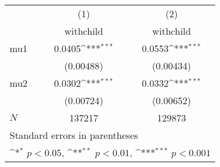 {
\def\sym#1{\ifmmode^{#1}\else\(^{#1}\)\fi}
\begin{tabular}{l*{2}{c}}
\toprule
            &\multicolumn{1}{c}{(1)}&\multicolumn{1}{c}{(2)}\\
            &\multicolumn{1}{c}{withchild}&\multicolumn{1}{c}{withchild}\\
\midrule
mu1         &      0.0405\sym{***}&      0.0553\sym{***}\\
            &   (0.00488)         &   (0.00434)         \\
\addlinespace
mu2         &      0.0302\sym{***}&      0.0332\sym{***}\\
            &   (0.00724)         &   (0.00652)         \\
\midrule
\(N\)       &      137217         &      129873         \\
\bottomrule
\multicolumn{3}{l}{\footnotesize Standard errors in parentheses}\\
\multicolumn{3}{l}{\footnotesize \sym{*} \(p<0.05\), \sym{**} \(p<0.01\), \sym{***} \(p<0.001\)}\\
\end{tabular}
}
